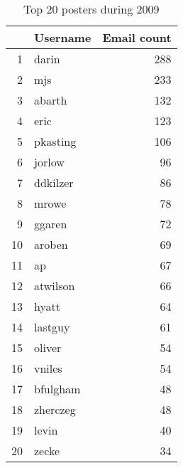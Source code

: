 \begin{table}[!htpb]
\begin{center}
\begin{tabular}{rlr}
  \hline
 & Username & Email count \\ 
  \hline
1 & darin & 288 \\ 
  2 & mjs & 233 \\ 
  3 & abarth & 132 \\ 
  4 & eric & 123 \\ 
  5 & pkasting & 106 \\ 
  6 & jorlow &  96 \\ 
  7 & ddkilzer &  86 \\ 
  8 & mrowe &  78 \\ 
  9 & ggaren &  72 \\ 
  10 & aroben &  69 \\ 
  11 & ap &  67 \\ 
  12 & atwilson &  66 \\ 
  13 & hyatt &  64 \\ 
  14 & lastguy &  61 \\ 
  15 & oliver &  54 \\ 
  16 & vniles &  54 \\ 
  17 & bfulgham &  48 \\ 
  18 & zherczeg &  48 \\ 
  19 & levin &  40 \\ 
  20 & zecke &  34 \\ 
   \hline
\end{tabular}
\caption{Top 20 posters during 2009}
\label{emails:2009top20}
\end{center}
\end{table}
